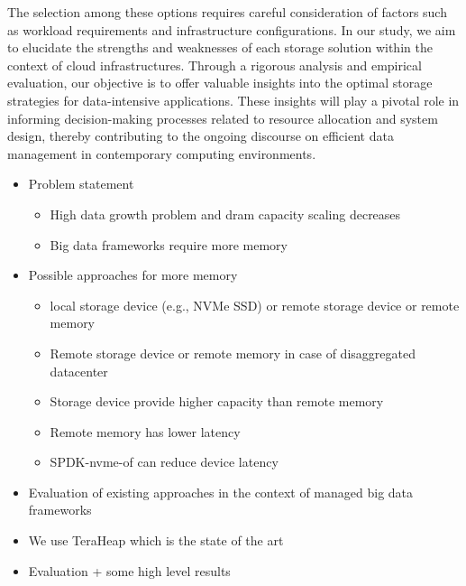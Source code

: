 The selection among these options requires careful consideration of factors such as workload requirements and infrastructure configurations. In our study, we aim to elucidate the strengths and weaknesses of each storage solution within the context of cloud infrastructures. Through a rigorous analysis and empirical evaluation, our objective is to offer valuable insights into the optimal storage strategies for data-intensive applications. These insights will play a pivotal role in informing decision-making processes related to resource allocation and system design, thereby contributing to the ongoing discourse on efficient data management in contemporary computing environments.
\begin{itemize}
  \item Problem statement
  \begin{itemize}
    \item High data growth problem and dram capacity scaling decreases
    \item Big data frameworks require more memory
  \end{itemize}

  \item Possible approaches for more memory
  \begin{itemize}
    \item local storage device (e.g., NVMe SSD) or remote storage device or
      remote memory 
    \item Remote storage device or remote memory in case of disaggregated
      datacenter
    \item Storage device provide higher capacity than remote memory
    \item Remote memory has lower latency
    \item SPDK-nvme-of can reduce device latency
  \end{itemize}

  \item Evaluation of existing approaches in the context of managed big data
    frameworks 
  \item We use TeraHeap which is the state of the art

  \item {Evaluation + some high level results}
\end{itemize}
